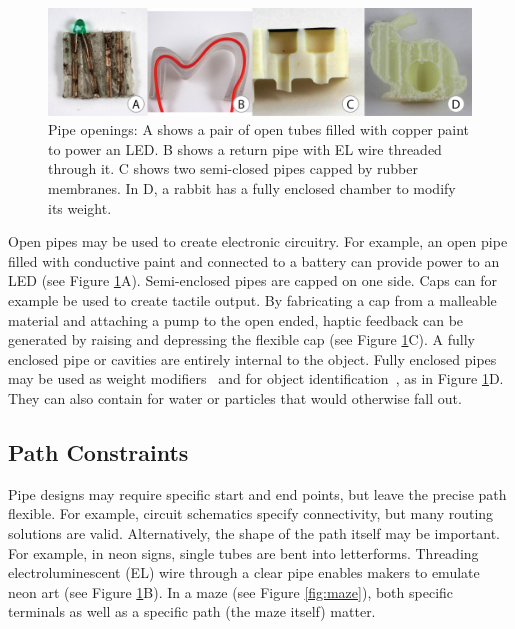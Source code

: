 \begin{figure}[t]
\centering
    \includegraphics[width=1.0\columnwidth]{figures/types.png}
\caption{Pipe openings: A shows a pair of open tubes filled with copper paint to power an LED.  B shows a return pipe with EL wire threaded through it.  C shows two semi-closed pipes capped by rubber membranes.  In D, a rabbit has a fully enclosed chamber to modify its weight.}
\label{fig:openings}
\end{figure}

Open pipes may be used to create electronic circuitry.  For example, an open pipe filled with conductive paint and connected to a battery can provide power to an LED (see Figure \ref{fig:openings}A).
%
Semi-enclosed pipes are capped on one side. Caps can for example be used to create tactile output. By fabricating a cap from a malleable material and attaching a pump to the open ended, haptic feedback can be generated by raising and depressing the flexible cap (see Figure \ref{fig:openings}C).
%
A fully enclosed pipe or cavities are entirely internal to the object.  Fully enclosed pipes may be used as weight modifiers~\cite{Prevost-makeitstand} and for object identification~\cite{Willis-infrastructs}, as in Figure \ref{fig:openings}D.  They can also contain for water or particles that would otherwise fall out.

\subsection{Path Constraints}
Pipe designs may require specific start and end points, but leave the precise path flexible. For example, circuit schematics specify connectivity, but many routing solutions are valid. Alternatively, the shape of the path itself may be important. For example, in neon signs, single tubes are bent into letterforms. Threading
 electroluminescent (EL) wire through a clear pipe enables makers to emulate neon art (see Figure \ref{fig:openings}B). 
In a maze (see Figure \ref{fig:maze}), both specific terminals as well as a specific path (the maze itself) matter. 

